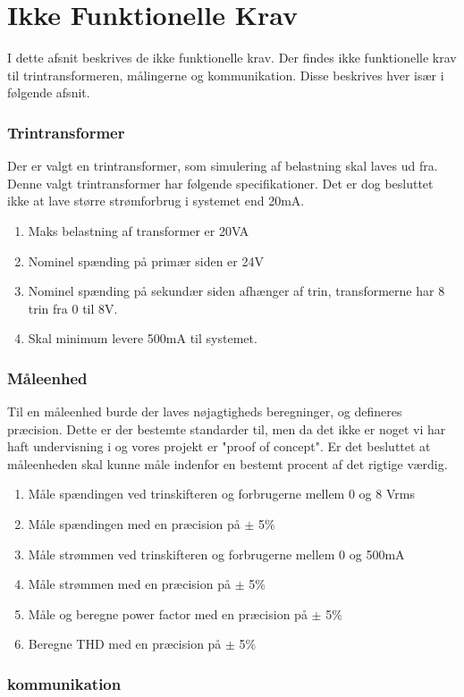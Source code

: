 
\section{Ikke Funktionelle Krav}
I dette afsnit beskrives de ikke funktionelle krav. Der findes ikke funktionelle krav til trintransformeren, målingerne og kommunikation. Disse beskrives hver især i følgende afsnit.

\subsubsection{Trintransformer}
Der er valgt en trintransformer, som simulering af belastning skal laves ud fra. Denne valgt trintransformer har følgende specifikationer. Det er dog besluttet ikke at lave større strømforbrug i systemet end 20mA. 

\begin{enumerate}
	\item Maks belastning af transformer er 20VA
	\item Nominel spænding på primær siden er 24V
	\item Nominel spænding på sekundær siden afhænger af trin, transformerne har 8 trin fra 0 til 8V.
	\item Skal minimum levere 500mA til systemet. 
\end{enumerate}

\subsubsection{Måleenhed}
Til en måleenhed burde der laves nøjagtigheds beregninger, og defineres præcision. Dette er der bestemte standarder til, men da det ikke er noget vi har haft undervisning i og vores projekt er "proof of concept". Er det besluttet at måleenheden skal kunne måle indenfor en bestemt procent af det rigtige værdig.

\begin{enumerate}
	\item Måle spændingen ved trinskifteren og forbrugerne mellem 0 og 8 Vrms
	\item Måle spændingen med en præcision på $\pm$ 5\%
	\item Måle strømmen ved trinskifteren og forbrugerne mellem 0 og 500mA
	\item Måle strømmen med en præcision på $\pm$ 5\%
	\item Måle og beregne power factor med en præcision på $\pm$ 5$\%$
	\item Beregne THD med en præcision på $\pm$ 5$\%$
\end{enumerate} 

\subsubsection{kommunikation}

